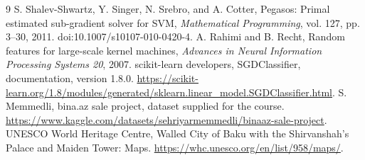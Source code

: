 \documentclass[10pt,twocolumn,a4paper]{article}
\begin{document}
\begin{thebibliography}{9}
 S. Shalev-Shwartz, Y. Singer, N. Srebro, and A. Cotter, Pegasos: Primal estimated sub-gradient solver for SVM, \emph{Mathematical Programming}, vol. 127, pp. 3--30, 2011. doi:10.1007/s10107-010-0420-4.
 A. Rahimi and B. Recht, Random features for large-scale kernel machines, \emph{Advances in Neural Information Processing Systems 20}, 2007.
 scikit-learn developers, SGDClassifier, documentation, version 1.8.0. \url{https://scikit-learn.org/1.8/modules/generated/sklearn.linear_model.SGDClassifier.html}.
 S. Memmedli, bina.az sale project, dataset supplied for the course. \url{https://www.kaggle.com/datasets/sehriyarmemmedli/binaaz-sale-project}.
 UNESCO World Heritage Centre, Walled City of Baku with the Shirvanshah's Palace and Maiden Tower: Maps. \url{https://whc.unesco.org/en/list/958/maps/}.
\end{thebibliography}
\end{document}
